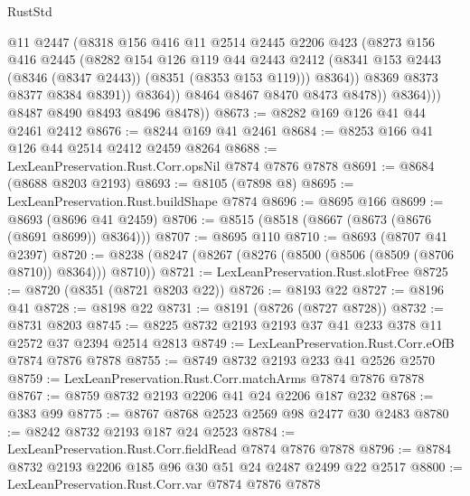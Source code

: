 \begin{lexlean}{RustStd}
\begin{coremodule}
                        @11
                        @2447
                        (@8318
                          @156
                          @416
                          @11
                          @2514
                          @2445
                          @2206
                          @423
                          (@8273
                            @156
                            @416
                            @2445
                            (@8282
                              @154
                              @126
                              @119
                              @44
                              @2443
                              @2412
                              (@8341 @153 @2443 (@8346 (@8347 @2443)) (@8351 (@8353 @153 @119)))
                              @8364))
                          @8369
                          @8373
                          @8377
                          @8384
                          @8391))
                      @8364))
                  @8464
                  @8467
                  @8470
                  @8473
                  @8478))
              @8364)))
        @8487
        @8490
        @8493
        @8496
        @8478))
@8673 := @8282 @169 @126 @41 @44 @2461 @2412
@8676 := @8244 @169 @41 @2461
@8684 := @8253 @166 @41 @126 @44 @2514 @2412 @2459 @8264
@8688 := LexLeanPreservation.Rust.Corr.opsNil @7874 @7876 @7878
@8691 := @8684 (@8688 @8203 @2193)
@8693 := @8105 (@7898 @8)
@8695 := LexLeanPreservation.Rust.buildShape @7874
@8696 := @8695 @166
@8699 := @8693 (@8696 @41 @2459)
@8706 := @8515 (@8518 (@8667 (@8673 (@8676 (@8691 @8699)) @8364)))
@8707 := @8695 @110
@8710 := @8693 (@8707 @41 @2397)
@8720 := @8238 (@8247 (@8267 (@8276 (@8500 (@8506 (@8509 (@8706 @8710)) @8364))) @8710))
@8721 := LexLeanPreservation.Rust.slotFree
@8725 := @8720 (@8351 (@8721 @8203 @22))
@8726 := @8193 @22
@8727 := @8196 @41
@8728 := @8198 @22
@8731 := @8191 (@8726 (@8727 @8728))
@8732 := @8731 @8203
@8745 := @8225 @8732 @2193 @2193 @37 @41 @233 @378 @11 @2572 @37 @2394 @2514 @2813
@8749 := LexLeanPreservation.Rust.Corr.eOfB @7874 @7876 @7878
@8755 := @8749 @8732 @2193 @233 @41 @2526 @2570
@8759 := LexLeanPreservation.Rust.Corr.matchArms @7874 @7876 @7878
@8767 := @8759 @8732 @2193 @2206 @41 @24 @2206 @187 @232
@8768 := @383 @99
@8775 := @8767 @8768 @2523 @2569 @98 @2477 @30 @2483
@8780 := @8242 @8732 @2193 @187 @24 @2523
@8784 := LexLeanPreservation.Rust.Corr.fieldRead @7874 @7876 @7878
@8796 := @8784 @8732 @2193 @2206 @185 @96 @30 @51 @24 @2487 @2499 @22 @2517
@8800 := LexLeanPreservation.Rust.Corr.var @7874 @7876 @7878

\end{coremodule}
\end{lexlean}
